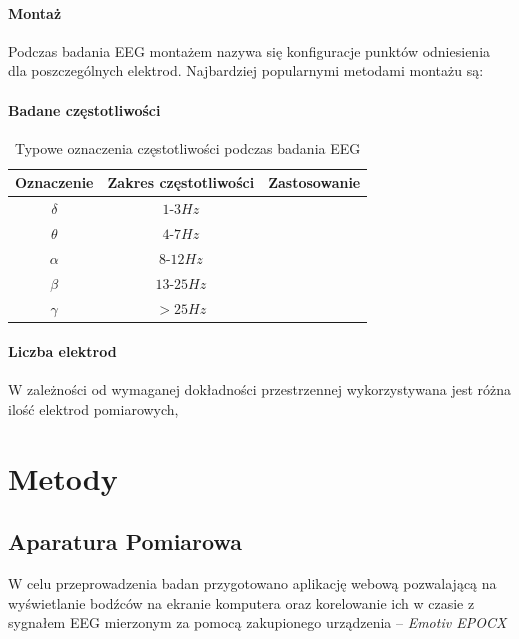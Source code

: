 \documentclass{./assets/wfis}
\begin{document}
\subsubsection{Montaż}
Podczas badania EEG montażem nazywa się konfiguracje punktów odniesienia dla poszczególnych elektrod. Najbardziej popularnymi metodami montażu są:


\subsubsection{Badane częstotliwości}

\begin{table}[h]
    \centering
    \begin{tabular}{|c|c|c|}
        \hline
        Oznaczenie & Zakres częstotliwości & Zastosowanie \\
        \hline
        $\delta$ & $1$-$3Hz$ & \\
        $\theta$ & $4$-$7Hz$ & \\
        $\alpha$ & $8$-$12Hz$ & \\
        $\beta$  & $13$-$25Hz$ & \\
        $\gamma$ & $>25Hz$ & \\
        \hline
    \end{tabular}
    \caption{Typowe oznaczenia częstotliwości podczas badania EEG}
    \label{tab:freqs}
\end{table}

\subsubsection{Liczba elektrod}

W zależności od wymaganej dokładności przestrzennej wykorzystywana jest różna ilość elektrod pomiarowych,

\chapter{Metody}


\section{Aparatura Pomiarowa}\label{aparatura-pomiarowa}
 W celu przeprowadzenia badan przygotowano aplikację webową pozwalającą na wyświetlanie bodźców na ekranie komputera oraz korelowanie ich w czasie z sygnałem EEG mierzonym za pomocą zakupionego urządzenia – \textit{Emotiv EPOCX}
\end{document}
